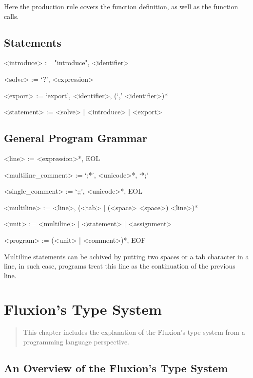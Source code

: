 \documentclass[11pt,a4paper]{book}
\begin{document}
Here the  production rule covers the function definition, as well as the function calls.

\section{Statements}

\begin{grammar}

<introduce> := "introduce", <identifier>

<solve> := `?', <expression>

<export> := `export', <identifier>, (`,' <identifier>)*

<statement> := <solve> | <introduce> | <export>

\end{grammar}

\section{General Program Grammar}

\begin{grammar}
<line> := <expression>*, EOL

<multiline\_comment> := `;*', <unicode>*, `*;'

<single\_comment> := `;;', <unicode>*, EOL

<multiline> := <line>, (<tab> | (<space> <space>) <line>)*

<unit> := <multiline> | <statement> | <assignment>

<program> := (<unit> | <comment>)*, EOF

\end{grammar}

Multiline statements can be achived by putting two spaces or a tab character in a line, in such case, programs treat this line as the continuation of the previous line.

\chapter{Fluxion's Type System}

\vspace{1em}
\begin{quotation}
This chapter includes the explanation of the Fluxion's type system from a programming language perspective.
\end{quotation}
\newpage


\section{An Overview of the Fluxion's Type System}
\end{document}
